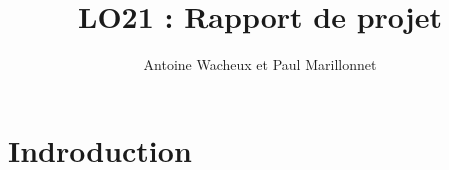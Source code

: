 \documentclass[a4paper,10pt,french]{report}
\begin{document}
\author{Antoine Wacheux et Paul Marillonnet}
\title{LO21 : Rapport de projet}\maketitle

\tableofcontents



\section*{Indroduction}\label{sec:Introduction}



\section{}\label{sec:I}
	\subsection{}\label{subsec:IA}
		\subsubsection{}
			\paragraph{}
			\paragraph{}
			\paragraph{}
		\subsubsection{}
			\paragraph{}
			\paragraph{}
			\paragraph{}
		\subsubsection{}
\end{document}
